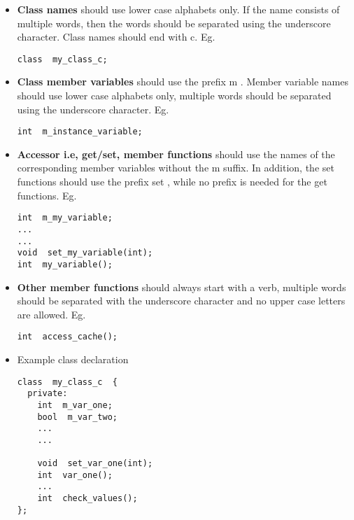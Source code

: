 \begin{itemize}

  \item \textbf{Class names} should use lower case alphabets only.  If the name
consists of multiple words, then the words should be separated using
the underscore character. Class names should end with c.  Eg.

\smallskip
\begin{lstlisting}
class  my_class_c;
\end{lstlisting}
\smallskip


  \item \textbf{Class member variables} should use the prefix m .  Member variable
names should use lower case alphabets only, multiple words should be
separated using the underscore character.  Eg.

\smallskip
\begin{lstlisting}
int  m_instance_variable;
\end{lstlisting}
\smallskip


  \item \textbf{Accessor i.e, get/set, member functions} should use
the names of the corresponding member variables without the m
suffix. In addition, the set functions should use the prefix set ,
while no prefix is needed for the get functions.  Eg.


\smallskip
\begin{lstlisting}
int  m_my_variable;
...
...
void  set_my_variable(int);
int  my_variable();
\end{lstlisting}
\smallskip


  \item \textbf{Other member functions} should always start with a
verb, multiple words should be separated with the underscore character
and no upper case letters are allowed.  Eg.

\smallskip
\begin{lstlisting}
int  access_cache();
\end{lstlisting}
\smallskip


  \item Example class declaration

\smallskip
\begin{lstlisting}
class  my_class_c  {
  private:
    int  m_var_one;
    bool  m_var_two;
    ...
    ...

    void  set_var_one(int);
    int  var_one();
    ...
    int  check_values();
};
\end{lstlisting}
\smallskip

\end{itemize}





